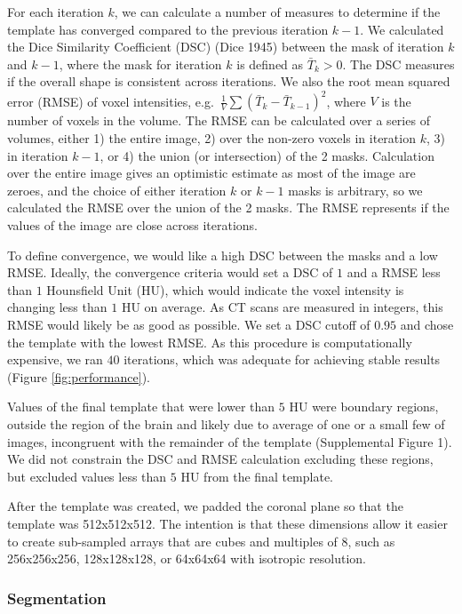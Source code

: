 \documentclass[]{elsarticle} %
\begin{document}
For each iteration \(k\), we can calculate a number of measures to determine if the template has converged compared to the previous iteration \(k - 1\). We calculated the Dice Similarity Coefficient (DSC) (Dice 1945) between the mask of iteration \(k\) and \(k-1\), where the mask for iteration \(k\) is defined as \(\bar{T}_{k} > 0\). The DSC measures if the overall shape is consistent across iterations. We also the root mean squared error (RMSE) of voxel intensities, e.g.~\(\frac{1}{V} \sum\left(\bar{T}_{k} - \bar{T}_{k-1}\right)^2\), where \(V\) is the number of voxels in the volume. The RMSE can be calculated over a series of volumes, either 1) the entire image, 2) over the non-zero voxels in iteration \(k\), 3) in iteration \(k-1\), or 4) the union (or intersection) of the 2 masks. Calculation over the entire image gives an optimistic estimate as most of the image are zeroes, and the choice of either iteration \(k\) or \(k-1\) masks is arbitrary, so we calculated the RMSE over the union of the 2 masks. The RMSE represents if the values of the image are close across iterations.

To define convergence, we would like a high DSC between the masks and a low RMSE. Ideally, the convergence criteria would set a DSC of \(1\) and a RMSE less than \(1\) Hounsfield Unit (HU), which would indicate the voxel intensity is changing less than \(1\) HU on average. As CT scans are measured in integers, this RMSE would likely be as good as possible. We set a DSC cutoff of \(0.95\) and chose the template with the lowest RMSE. As this procedure is computationally expensive, we ran \(40\) iterations, which was adequate for achieving stable results (Figure \ref{fig:performance}).

Values of the final template that were lower than \(5\) HU were boundary regions, outside the region of the brain and likely due to average of one or a small few of images, incongruent with the remainder of the template (Supplemental Figure 1). We did not constrain the DSC and RMSE calculation excluding these regions, but excluded values less than \(5\) HU from the final template.

After the template was created, we padded the coronal plane so that the template was 512x512x512. The intention is that these dimensions allow it easier to create sub-sampled arrays that are cubes and multiples of 8, such as 256x256x256, 128x128x128, or 64x64x64 with isotropic resolution.

\hypertarget{segmentation}{%
\subsubsection{Segmentation}\label{segmentation}}
\end{document}
